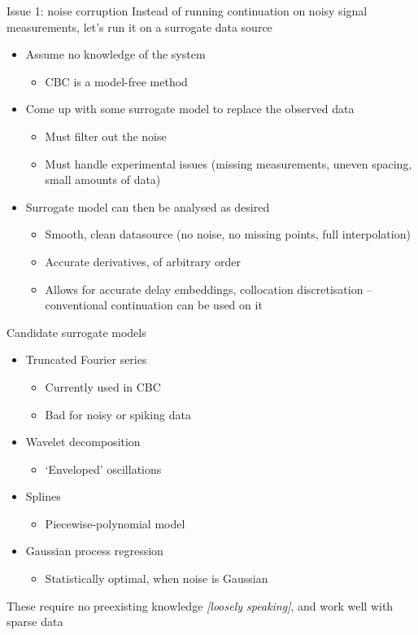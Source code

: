 \documentclass[presentation]{beamer}
\begin{document}
\begin{frame}[label={sec:org2e93256}]{Issue 1: noise corruption}
Instead of running continuation on noisy signal measurements, let's run it on a surrogate data source
\begin{itemize}[<+->]
\item Assume no knowledge of the system
\begin{itemize}
\item CBC is a model-free method
\end{itemize}
\item Come up with some surrogate model to replace the observed data
\begin{itemize}
\item Must filter out the noise
\item Must handle experimental issues (missing measurements, uneven spacing, small amounts of data)
\end{itemize}
\item Surrogate model can then be analysed as desired
\begin{itemize}
\item Smooth, clean datasource (no noise, no missing points, full interpolation)
\item Accurate derivatives, of arbitrary order
\item Allows for accurate delay embeddings, collocation discretisation -- conventional continuation can be used on it
\end{itemize}
\end{itemize}

\vfill
\end{frame}

\begin{frame}[label={sec:orgee407e3}]{Candidate surrogate models}
\begin{itemize}[<+->]
\item Truncated Fourier series
\begin{itemize}
\item Currently used in CBC
\item Bad for noisy or spiking data
\end{itemize}
\item Wavelet decomposition
\begin{itemize}
\item `Enveloped' oscillations
\end{itemize}
\item Splines
\begin{itemize}
\item Piecewise-polynomial model
\end{itemize}
\item Gaussian process regression
\begin{itemize}
\item Statistically optimal, when noise is Gaussian
\end{itemize}
\end{itemize}

These require no preexisting knowledge \emph{[loosely speaking]}, and work well with sparse data
\end{frame}
\end{document}
